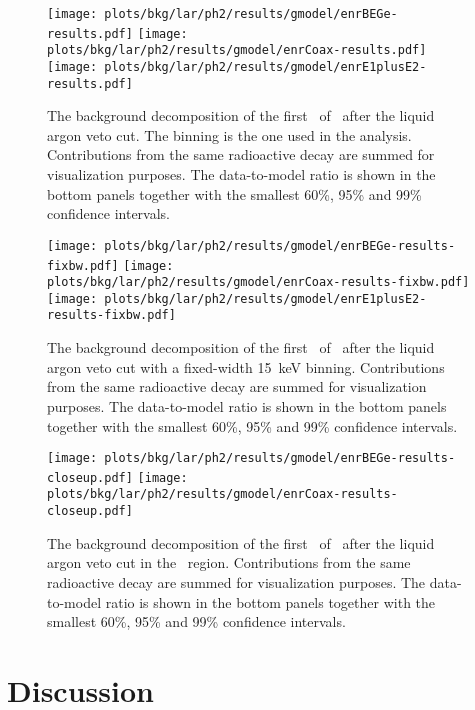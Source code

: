 \begin{figure}
  \centering
  \texttt{[image: plots/bkg/lar/ph2/results/gmodel/enrBEGe-results.pdf]}
  \texttt{[image: plots/bkg/lar/ph2/results/gmodel/enrCoax-results.pdf]}
  \texttt{[image: plots/bkg/lar/ph2/results/gmodel/enrE1plusE2-results.pdf]}
  \caption{%
    The background decomposition of the first \gexpophasetwobkg\ of \gerdatwo\ after the
    liquid argon veto cut. The binning is the one used in the analysis. Contributions from
    the same radioactive decay are summed for visualization purposes. The data-to-model
    ratio is shown in the bottom panels together with the smallest 60\%, 95\% and 99\%
    confidence intervals.
  }\label{fig:bkg:lar:ph2:results}
\end{figure}

\begin{figure}
  \centering
  \texttt{[image: plots/bkg/lar/ph2/results/gmodel/enrBEGe-results-fixbw.pdf]}
  \texttt{[image: plots/bkg/lar/ph2/results/gmodel/enrCoax-results-fixbw.pdf]}
  \texttt{[image: plots/bkg/lar/ph2/results/gmodel/enrE1plusE2-results-fixbw.pdf]}
  \caption{%
    The background decomposition of the first \gexpophasetwobkg\ of \gerdatwo\ after the
    liquid argon veto cut with a fixed-width 15~keV binning. Contributions from the same
    radioactive decay are summed for visualization purposes. The data-to-model ratio is
    shown in the bottom panels together with the smallest 60\%, 95\% and 99\% confidence
    intervals.
  }\label{fig:bkg:lar:ph2:results-fixbw}
\end{figure}

\begin{figure}
  \centering
  \texttt{[image: plots/bkg/lar/ph2/results/gmodel/enrBEGe-results-closeup.pdf]}
  \texttt{[image: plots/bkg/lar/ph2/results/gmodel/enrCoax-results-closeup.pdf]}
  \caption{%
    The background decomposition of the first \gexpophasetwobkg\ of \gerdatwo\ after the
    liquid argon veto cut in the \nnbb\ region. Contributions from the same radioactive
    decay are summed for visualization purposes. The data-to-model ratio is shown in the
    bottom panels together with the smallest 60\%, 95\% and 99\% confidence intervals.
  }\label{fig:bkg:lar:ph2:results-closeup}
\end{figure}

\section{Discussion}%
\label{sec:bkg:lar:ph2:discussion}

